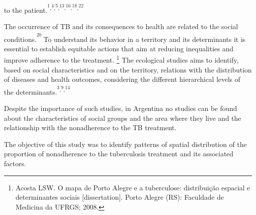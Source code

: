 \begin{multicols}{2}
to the patient.\allowbreak{}\textsuperscript{\textsuperscript{1}}\textsuperscript{,\allowbreak{}}\textsuperscript{\textsuperscript{4}}\textsuperscript{,\allowbreak{}}\textsuperscript{\textsuperscript{5}}\textsuperscript{,\allowbreak{}}\textsuperscript{\textsuperscript{13}}\textsuperscript{,\allowbreak{}}\textsuperscript{\textsuperscript{16}}\textsuperscript{,\allowbreak{}}\textsuperscript{\textsuperscript{18}}\textsuperscript{,\allowbreak{}}\textsuperscript{\textsuperscript{22}}\par{}The occurrence of TB and its consequences to health are related to the social conditions.\allowbreak{}\textsuperscript{\textsuperscript{20}} To understand its behavior in a territory and its determinants it is essential to establish equitable actions that aim at reducing inequalities and improve adherence to the treatment.\allowbreak{} \protect\footnote{ Acosta LSW.\allowbreak{} O mapa de Porto Alegre e a tuberculose:\allowbreak{} distribuição espacial e determinantes sociais [dissertation].\allowbreak{} Porto Alegre (\allowbreak{}RS)\allowbreak{}:\allowbreak{} Faculdade de Medicina da UFRGS; 2008.\allowbreak{}} The ecological studies aims to identify,\allowbreak{} based on social characteristics and on the territory,\allowbreak{} relations with the distribution of diseases and health outcomes,\allowbreak{} considering the different hierarchical levels of the determinants.\allowbreak{}\textsuperscript{\textsuperscript{3}}\textsuperscript{,\allowbreak{}}\textsuperscript{\textsuperscript{9}}\textsuperscript{,\allowbreak{}}\textsuperscript{\textsuperscript{14}}\par{}Despite the importance of such studies,\allowbreak{} in Argentina no studies can be found about the characteristics of social groups and the area where they live and the relationship with the nonadherence to the TB treatment.\allowbreak{}\par{}The objective of this study was to identify patterns of spatial distribution of the proportion of nonadherence to the tuberculosis treatment and its associated factors.\allowbreak{}

\end{multicols}
